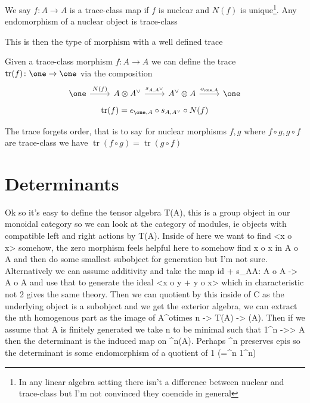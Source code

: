 \documentclass{report}
\begin{document}
\begin{definition}
    We say $f \colon A \to A$ is a trace-class map if $f$ is nuclear and $N(f)$ is unique\footnote{In any linear algebra setting there isn't a difference between nuclear and trace-class but I'm not convinced they coencide in general}. Any endomorphism of a nuclear object is trace-class
\end{definition}
This is then the type of morphism with a well defined trace
\begin{definition}[Trace]
    Given a trace-class morphism $f \colon A \to A$ we can define the trace $\operatorname{tr}(f) \colon \one \to \one$ via the composition
    \[
\begin{tikzcd}
 \one \arrow[r,"N(f)"] & A \otimes A^\vee \arrow  [r,"{s_{A,A^\vee}}"] & A^\vee \otimes A \arrow [r,"{\epsilon_{\one,A}}"] &\one  
\end{tikzcd}
    \]
    \[
\operatorname{tr}(f) = \epsilon_{\one,A}\circ s_{A,A^\vee}\circ N(f)
    \]
\end{definition}
\begin{lemma}
    The trace forgets order, that is to say for nuclear morphisms $f,g$ where $f\circ g, g \circ f$ are trace-class we have $\operatorname{tr}(f \circ g) = \operatorname{tr}(g \circ f)$
\end{lemma}
\pagebreak
\section{Determinants}
\begin{spverbatim}
  Ok so it's easy to define the tensor algebra T(A), this is a group object in our monoidal category so we can look at the category of modules, ie objects with compatible left and right actions by T(A). Inside of here we want to find <x o x> somehow, the zero morphism feels helpful here to somehow find x o x in A o A and then do some smallest subobject for generation but I'm not sure. Alternatively we can assume additivity and take the map id + s_AA: A o A -> A o A and use that to generate the ideal <x o y + y o x> which in characteristic not 2 gives the same theory. Then we can quotient by this inside of C as the underlying object is a subobject and we get the exterior algebra, we can extract the nth homogenous part as the image of A^otimes n -> T(A) -> \bigwedge(A). Then if we assume that A is finitely generated we take n to be minimal such that 1^n ->> A then the determinant is the induced map on \bigwedge^n(A). Perhaps \bigwedge^n preserves epis so the determinant is some endomorphism of a quotient of 1 (=\bigwedge^n 1^n)
\end{spverbatim}
\end{document}
